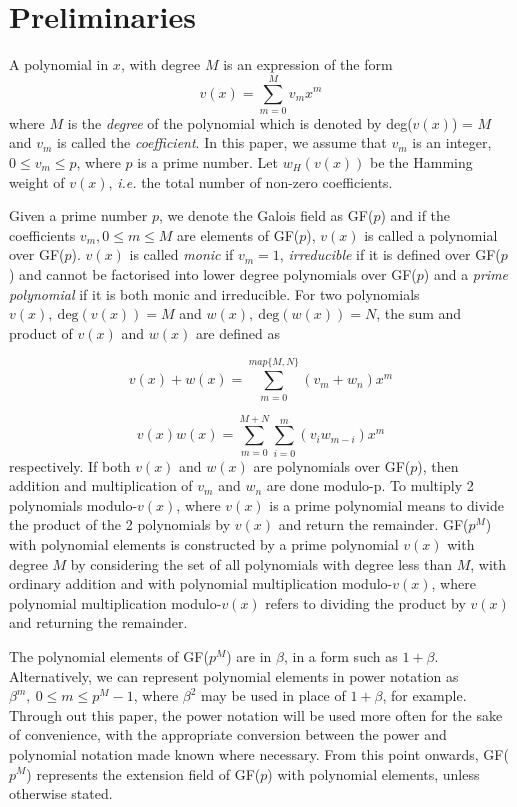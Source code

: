 \section{Preliminaries}
\label{secPrelim}

A polynomial in $x$, with degree $M$ is an expression of the form
\begin{equation*}
v(x) = \sum_{m=0}^{M} v_mx^m
\end{equation*}
where $M$ is the \textit{degree} of the polynomial which is denoted by deg($v(x)$) = $M$ and $v_m$ is called the \textit{coefficient}. In this paper, we assume that $v_m$ is an integer, $0 \leq v_m \leq p$, where $p$ is a prime number. 
 Let $w_H(v(x))$ be the Hamming weight of $v(x)$, \textit{i.e.} the total number of non-zero coefficients.

Given a prime number $p$, we denote the Galois field as GF($p$) and if the coefficients $v_m, 0 \leq m \leq M$ are elements of GF($p$), $v(x)$ is called a polynomial over GF($p$). $v(x)$ is called \textit{monic} if $v_m=1$, \textit{irreducible} if it is defined over GF($p$) and cannot be factorised into lower degree polynomials over GF($p$) and a \textit{prime polynomial} if it is both monic and irreducible. 
For two polynomials $v(x),~\text{deg}(v(x))=M$ and $w(x),~\text{deg}(w(x))=N$, the sum and product of $v(x)$ and $w(x)$ are defined as 

\begin{equation*}
v(x)+w(x)=\sum_{m=0}^{map\{ M,N\}} (v_m +w_n)x^m
\end{equation*}

\begin{equation*}
v(x)w(x)=\sum_{m=0}^{ M+N} \sum_{i=0}^{m} (v_i w_{m-i})x^m
\end{equation*}
 respectively.
If both $v(x)$ and $w(x)$ are polynomials over GF($p$), then addition and multiplication of $v_m$ and $w_n$ are done modulo-p.
To multiply 2 polynomials modulo-$v(x)$, where $v(x)$ is a prime polynomial means to divide the product of the 2 polynomials by $v(x)$ and return the remainder.
GF($p^M$) with polynomial elements is constructed by a prime polynomial $v(x)$  with degree $M$ by considering the set of all polynomials with degree less than $M$, with ordinary addition and with polynomial multiplication modulo-$v(x)$, where polynomial multiplication modulo-$v(x)$ refers to dividing the product by $v(x)$ and returning the remainder.

The polynomial elements of GF($p^M$) are in $\beta$, in a form such as $1+\beta$. Alternatively, we can represent polynomial elements in power notation as $\beta^m,~0 \leq m \leq p^M-1$, where $\beta^2$ may be used in place of $1+\beta$, for example. Through out this paper, the power notation will be used more often for the sake of convenience, with the appropriate conversion between the power and polynomial notation made known where necessary. From this point onwards, GF($p^M$) represents the extension field of GF($p$) with polynomial elements, unless otherwise stated.

